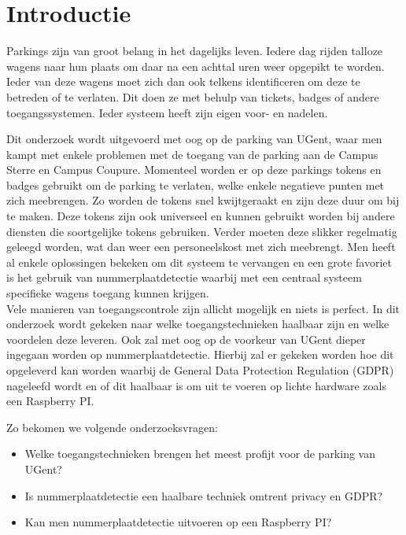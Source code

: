 
\section{Introductie} %
\label{sec:introductie}

Parkings zijn van groot belang in het dagelijks leven. Iedere dag rijden talloze wagens naar hun plaats om daar na een achttal uren weer opgepikt te worden. Ieder van deze wagens moet zich dan ook telkens identificeren om deze te betreden of te verlaten. Dit doen ze met behulp van tickets, badges of andere toegangssystemen. Ieder systeem heeft zijn eigen voor- en nadelen.

Dit onderzoek wordt uitgevoerd met oog op de parking van UGent, waar men kampt met enkele problemen met de toegang van de parking aan de Campus Sterre en Campus Coupure. Momenteel worden er op deze parkings tokens en badges gebruikt om de parking te verlaten, welke enkele negatieve punten met zich meebrengen. Zo worden de tokens snel kwijtgeraakt en zijn deze duur om bij te maken. Deze tokens zijn ook universeel en kunnen gebruikt worden bij andere diensten die soortgelijke tokens gebruiken. Verder moeten deze slikker regelmatig geleegd worden, wat dan weer een personeelskost met zich meebrengt. Men heeft al enkele oplossingen bekeken om dit systeem te vervangen en een grote favoriet is het gebruik van nummerplaatdetectie waarbij met een centraal systeem specifieke wagens toegang kunnen krijgen.
\\
Vele manieren van toegangscontrole zijn allicht mogelijk en niets is perfect. In dit onderzoek wordt gekeken naar welke toegangstechnieken haalbaar zijn en welke voordelen deze leveren. Ook zal met oog op de voorkeur van UGent dieper ingegaan worden op nummerplaatdetectie. Hierbij zal er gekeken worden hoe dit opgeleverd kan worden waarbij de General Data Protection Regulation (GDPR) nageleefd wordt en of dit haalbaar is om uit te voeren op lichte hardware zoals een Raspberry PI.

Zo bekomen we volgende onderzoeksvragen:
\begin{itemize}
	\item Welke toegangstechnieken brengen het meest profijt voor de parking van UGent?
	\item Is nummerplaatdetectie een haalbare techniek omtrent privacy en GDPR?
	\item Kan men nummerplaatdetectie uitvoeren op een Raspberry PI?
\end{itemize}

